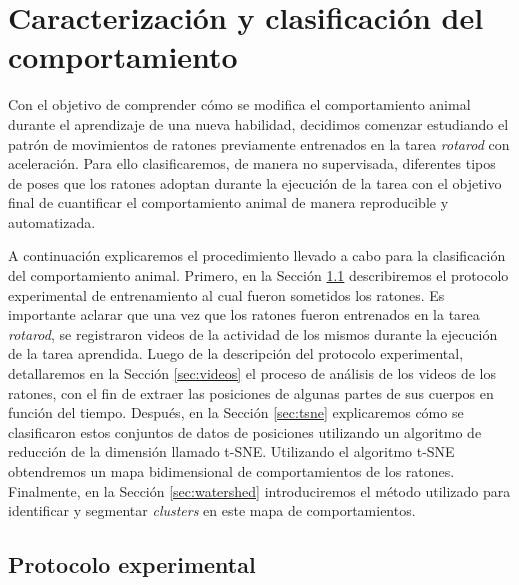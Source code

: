 \chapter{Caracterización y clasificación del comportamiento}\label{cha:mapa}

Con el objetivo de comprender cómo se modifica el comportamiento animal durante el aprendizaje de una nueva habilidad, decidimos comenzar estudiando el patrón de movimientos de ratones previamente entrenados en la tarea \textit{rotarod} con aceleración. Para ello clasificaremos, de manera no supervisada, diferentes tipos de poses que los ratones adoptan durante la ejecución de la tarea con el objetivo final de cuantificar el comportamiento animal de manera reproducible y automatizada.

A continuación explicaremos el procedimiento llevado a cabo para la clasificación del comportamiento animal. Primero, en la Sección \ref{sec:protocolo} describiremos el protocolo experimental de entrenamiento al cual fueron sometidos los ratones. Es importante aclarar que una vez que los ratones fueron entrenados en la tarea \textit{rotarod}, se registraron videos de la actividad de los mismos durante la ejecución de la tarea aprendida. Luego de la descripción del protocolo experimental, detallaremos en la Sección \ref{sec:videos} el proceso de análisis de los videos de los ratones, con el fin de extraer las posiciones de algunas partes de sus cuerpos en función del tiempo. Después, en la Sección \ref{sec:tsne} explicaremos cómo se clasificaron estos conjuntos de datos de posiciones utilizando un algoritmo de reducción de la dimensión llamado t-SNE. Utilizando el algoritmo t-SNE obtendremos un mapa bidimensional de comportamientos de los ratones. Finalmente, en la Sección \ref{sec:watershed} introduciremos el método utilizado para identificar y segmentar \textit{clusters} en este mapa de comportamientos.

\section{Protocolo experimental}\label{sec:protocolo}

